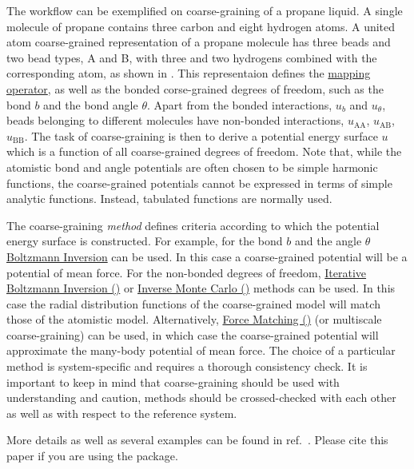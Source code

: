 The workflow can be exemplified on coarse-graining of a propane liquid. A single molecule of propane contains three carbon and eight hydrogen atoms. A united atom coarse-grained representation of a propane molecule has three beads and two bead types, A and B, with three and two hydrogens combined with the corresponding atom, as shown in . This representaion defines the \hyperref[sec:mapping_operator]{mapping operator}, as well as the bonded corse-grained degrees of freedom, such as the bond $b$ and the bond angle $\theta$. Apart from the bonded interactions, $u_b$ and $u_\theta$, beads belonging to different molecules have non-bonded interactions, $u_\text{AA}$, $u_\text{AB}$, $u_\text{BB}$. The task of coarse-graining is then to derive a potential energy surface $u$ which is a function of all coarse-grained degrees of freedom. Note that, while the atomistic bond and angle potentials are often chosen to be simple harmonic functions, the coarse-grained potentials cannot be expressed in terms of simple analytic functions. Instead, tabulated functions are normally used. 

The coarse-graining {\em method} defines criteria according to which the potential energy surface is constructed. For example, for the bond $b$ and the angle $\theta$  \hyperref[sec:bi]{Boltzmann Inversion} can be used. In this case a coarse-grained potential will be a potential of mean force. For the non-bonded degrees of freedom, 
\hyperref[sec:ibi]{Iterative Boltzmann Inversion (\ibi)} or \hyperref[sec:imc]{Inverse Monte Carlo (\imc)} methods can be used. In this case the radial distribution functions of the coarse-grained model will match those of the atomistic model. Alternatively, \hyperref[sec:fm]{Force Matching (\fm)} (or multiscale coarse-graining) can be used, in which case the coarse-grained potential will approximate the many-body potential of mean force. The choice of a particular method is system-specific and requires a thorough consistency check. It is important to keep in mind that coarse-graining should be used with understanding and caution, methods should be crossed-checked with each other as well as with respect to the reference system.

More details as well as several examples can be found in ref.~\cite{Ruehle:2009.a}. Please cite this paper if you are using the package. 